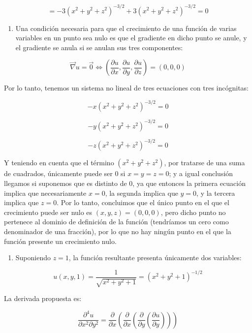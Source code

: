 \documentclass[
  a4paper,
]{scrreport}
\providecommand{\tightlist}{%
  \setlength{\itemsep}{0pt}\setlength{\parskip}{0pt}}\usepackage{longtable,booktabs,array}
\theoremstyle{definition}
\theoremstyle{remark}
\begin{document}
\begin{tcolorbox}
\[
=- 3\left( {x^2  + y^2  + z^2 } \right)^{ - 3/2}  + 3\left( {x^2  +
y^2 + z^2 } \right)^{ - 3/2}  = 0
\]

\begin{enumerate}
\def\labelenumi{\alph{enumi}.}
\tightlist
\item
  Una condición necesaria para que el crecimiento de una función de
  varias variables en un punto sea nulo es que el gradiente en dicho
  punto se anule, y el gradiente se anula si se anulan sus tres
  componentes:
\end{enumerate}

\[
\vec \nabla u = \vec 0 \Leftrightarrow \left( {\frac{{\partial
u}}{{\partial x}},\frac{{\partial u}}{{\partial y}},\frac{{\partial
u}}{{\partial z}}} \right) = \left( {0,0,0} \right)
\]

Por lo tanto, tenemos un sistema no lineal de tres ecuaciones con tres
incógnitas:

\[
 - x\left( {x^2  + y^2  + z^2 } \right)^{ - 3/2}  = 0
\]

\[
 - y\left( {x^2  + y^2  + z^2 } \right)^{ - 3/2}  = 0
\]

\[
 - z\left( {x^2  + y^2  + z^2 } \right)^{ - 3/2}  = 0
\]

Y teniendo en cuenta que el término \((x^2+y^2+z^2)\), por tratarse de
una suma de cuadrados, únicamente puede ser 0 si \(x=y=z=0\); y a igual
conclusión llegamos si suponemos que es distinto de 0, ya que entonces
la primera ecuación implica que necesariamente \(x=0\), la segunda
implica que \(y=0\), y la tercera implica que \(z=0\). Por lo tanto,
concluimos que el único punto en el que el crecimiento puede ser nulo es
\((x,y,z)=(0,0,0)\), pero dicho punto no pertenece al dominio de
definición de la función (tendríamos un cero como denominador de una
fracción), por lo que no hay ningún punto en el que la función presente
un crecimiento nulo.

\begin{enumerate}
\def\labelenumi{\alph{enumi}.}
\tightlist
\item
  Suponiendo \(z=1\), la función resultante presenta únicamente dos
  variables:
\end{enumerate}

\[
u(x,y,1) = \frac{1}{{\sqrt {x^2  + y^2  + 1} }} = \left( {x^2  + y^2
+ 1} \right)^{ - 1/2}
\]

La derivada propuesta es:

\[
\frac{{\partial ^4 u}}{{\partial x^2 \partial y^2 }} =
\frac{\partial }{{\partial x}}\left( {\frac{\partial }{{\partial
x}}\left( {\frac{\partial }{{\partial y}}\left( {\frac{{\partial
u}}{{\partial y}}} \right)} \right)} \right)
\]


\end{tcolorbox}
\end{document}
